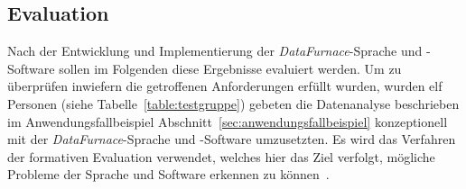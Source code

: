 \documentclass[
  language=german, %
  type=bachelor,%
  ngerman
]{isthesis}
\begin{document}
\begin{content}

%  


\chapter{Evaluation}\label{ch:evaluation}

Nach der Entwicklung und Implementierung der \textit{DataFurnace}-Sprache und
-Software sollen im Folgenden diese Ergebnisse evaluiert werden. Um zu
überprüfen inwiefern die getroffenen Anforderungen erfüllt wurden, wurden elf
Personen (siehe Tabelle~\ref{table:testgruppe}) gebeten die Datenanalyse
beschrieben im Anwendungsfallbeispiel
Abschnitt~\ref{sec:anwendungsfallbeispiel} konzeptionell mit der
\textit{DataFurnace}-Sprache und -Software umzusetzten. Es wird das Verfahren
der formativen Evaluation verwendet, welches hier das Ziel verfolgt, mögliche
Probleme der Sprache und Software erkennen zu können~\cite[][S. 9]{hegner2003methoden}.


\end{content}
\end{document}
